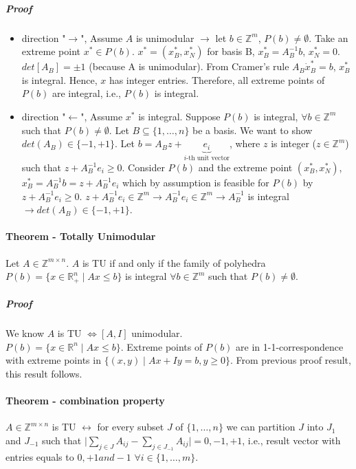\documentclass[main]{subfiles}
\begin{document}
\subparagraph{Proof}
\begin{itemize}
\itemsep0em
\item direction "$\rightarrow$", Assume $A$ is unimodular $\rightarrow$ let $b
\in \mathbb{Z}^{m}$, $P(b) \neq \emptyset$. Take an extreme point $x^{*} \in
P(b)$. $x^{*} = (x^{*}_{B}, x^{*}_{N})$ for basis B, $x^{*}_{B} = A^{-1}_{B}b$,
$x^{*}_{N} = 0$.\\
$det[A_{B}] = \pm 1$ (because A is unimodular). From Cramer's rule $A_{B} \dot
x^{*}_{B} = b$, $x^{*}_{B}$ is integral. Hence, $x$ has integer entries.
Therefore, all extreme points of $P(b)$ are integral, i.e., $P(b)$ is integral.

\item direction "$\leftarrow$", Assume $x^{*}$ is integral. Suppose $P(b)$ is
integral, $\forall b \in \mathbb{Z}^{m}$ such that $P(b) \neq \emptyset$. Let
$B \subseteq \{1, \dots, n\}$ be a basis. We want to show $det(A_{B}) \in \{-1,
+1\}$.
Let $b = A_{B}z + \underbrace{e_{i}}_{\text{$i$-th unit vector}}$, where $z$ is
integer ($z \in \mathbb{Z}^{m}$) such that $z + A^{-1}_{B} e_{i} \geq 0$.
Consider $P(b)$ and the extreme point $(x^{*}_{B}, x^{*}_{N})$, $x^{*}_{B} =
A^{-1}_{B}b = z + A^{-1}_{B} e_{i}$ which by assumption is feasible for $P(b)$
by $z + A^{-1}_{B} e_{i} \geq 0$. $z + A^{-1}_{B} e_{i} \in \mathbb{Z}^{m}
\rightarrow A^{-1}_{B} e_{i} \in \mathbb{Z}^{m} \rightarrow A^{-1}_{B}$ is
integral $\rightarrow det(A_{B}) \in \{-1, +1\}$.
\end{itemize}

\paragraph{Theorem - Totally Unimodular}
Let $A \in \mathbb{Z}^{m \times n}$. $A$ is TU if and only if the family of
polyhedra $P(b) = \{ x \in \mathbb{R}^{n}_+ \mid Ax \leq b \}$ is integral
$\forall b \in \mathbb{Z}^{m}$ such that $P(b) \neq \emptyset$.

\subparagraph{Proof}
We know $A$ is TU $\iff [A,I]$ unimodular.\\
$P(b) = \{x \in \mathbb{R}^{n} \mid Ax \leq b \}$. Extreme points of $P(b)$ are
in 1-1-correspondence with extreme points in $\{(x,y) \mid Ax + Iy = b, y \geq
0 \}$. From previous proof result, this result follows.

\paragraph{Theorem - combination property} $A \in \mathbb{Z}^{m \times n}$ is
TU $\leftrightarrow$ for every subset $J$ of $\{1, \dots, n\}$ we can partition
$J$ into $J_{1}$ and $J_{-1}$ such that $\mid \sum_{j \in J} A_{ij} -
\sum_{j \in J_{-1}} A_{ij} \mid = {0, -1, +1}$, i.e., result vector with
entries equals to $0, +1 and -1$ $\forall i \in \{1, \dots, m\}$.
\end{document}

